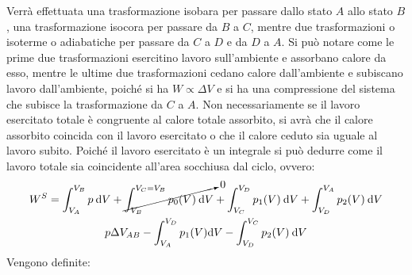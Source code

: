 \documentclass{article}
\newcommand{\df}{\mathrm{d}}
\numberwithin{equation}{subsection}
\begin{document}
Verrà effettuata una trasformazione isobara per 
passare dallo stato $A$ allo stato $B$, una trasformazione 
isocora per passare da $B$ a $C$, mentre due trasformazioni 
o isoterme o adiabatiche per passare da $C$ a $D$ e da $D$ a $A$. 
Si può notare come le prime due trasformazioni esercitino 
lavoro sull'ambiente e assorbano calore da esso, mentre 
le ultime due trasformazioni cedano calore dall'ambiente e 
subiscano lavoro dall'ambiente, poiché si ha $W\propto \Delta V$ 
e si ha una compressione del sistema che subisce la trasformazione 
da $C$ a $A$. Non necessariamente se il lavoro esercitato totale è 
congruente al calore totale assorbito, si avrà che il calore 
assorbito coincida con il lavoro esercitato o che il calore 
ceduto sia uguale al lavoro subito. Poiché il lavoro esercitato 
è un integrale si può dedurre come il lavoro totale sia 
coincidente all'area socchiusa dal ciclo, ovvero:
\begin{gather*}
    W^S=\displaystyle\int_{V_A}^{V_B}p\:\df V+\cancelto{0}{\int_{V_B}^{V_C=V_B}p_0(V)\:\df V}+\int_{V_C}^{V_D}p_1(V)\:\df V+\int_{V_D}^{V_A}p_2(V)\:\df V\\
    p\Delta V_{AB}-\int_{V_A}^{V_D}p_1(V)\df V-\int_{V_D}^{V_C}p_2(V)\:\df V
\end{gather*}
Vengono definite:
\end{document}
